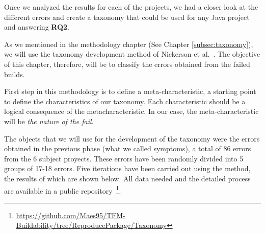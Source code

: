 Once we analyzed the results for each of the projects, we had a closer look at the different errors and create a taxonomy that could be used for any Java project and answering \textbf{RQ2}.

As we mentioned in the methodology chapter (See Chapter \ref{subsec:taxonomy}), we will use the taxonomy development method of Nickerson et al.~\cite{Nickerson2013}. The objective of this chapter, therefore, will be to classify the errors obtained from the failed builds.

First step in this methodology is to define a meta-characteristic, a starting point to define the characteristics of our taxonomy. Each characteristic should be a logical consequence of the metacharacteristic. In our case, the meta-characteristic will be \textit{the nature of the fail}. 

The objects that we will use for the development of the taxonomy were the errors obtained in the previous phase (what we called symptoms), a total of 86 errors from the 6 subject proyects. These errors have been randomly divided into 5 groups of 17-18 errors. Five iterations have been carried out using the method, the results of which are shown below. All data needed and the detailed process are available in a public repository~\footnote{\url{https://github.com/Maes95/TFM-Buildability/tree/ReproducePackage/Taxonomy}}.

